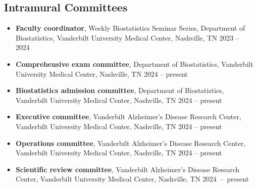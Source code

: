 \documentclass[12pt]{article}
\begin{document}
	\subsection*{Intramural Committees}
	\begin{itemize}
		\item {\bf Faculty coordinator}, Weekly Biostatistics 
		Seminar Series, Department of Biostatistics, Vanderbilt 
		University Medical Center, Nashville, TN \hfill 2023 -- 2024
		\item {\bf Comprehensive exam committee}, Department of 
		Biostatistics, Vanderbilt University Medical Center, 
		Nashville, TN \hfill 2024 -- present
		\item {\bf Biostatistics admission committee}, Department of 
		Biostatistics, Vanderbilt University Medical Center, 
		Nashville, TN \hfill 2024 -- present
		\item {\bf Executive committee}, Vanderbilt Alzheimer's 
		Disease Research Center, Vanderbilt University Medical 
		Center, Nashville, TN \hfill 2024 -- present
		\item {\bf Operations committee}, Vanderbilt Alzheimer's 
		Disease Research Center, Vanderbilt University Medical 
		Center, Nashville, TN \hfill 2024 -- present
		\item {\bf Scientific review committee}, Vanderbilt 
		Alzheimer's Disease Research Center, Vanderbilt University 
		Medical Center, Nashville, TN \hfill \mbox{2024 -- present}
	\end{itemize}
	
\end{document}
